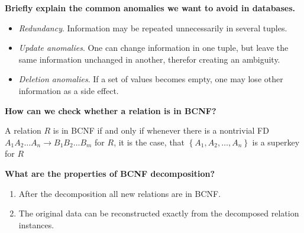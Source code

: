 \documentclass[a4paper]{article}
\newcommand{\set}[1]{\left\{#1\right\}}
\newcommand{\ra}{\rightarrow}
\newenvironment{problem}[1][\unskip]%
{\centering\textbf{ #1}%

\vspace{0.5cm}
\begin{em}}%
{\end{em}}
\newenvironment{answer}%
{\begin{framed}%
\vspace{0.5cm}}%
{\end{framed}\vspace{0.5cm}}
\begin{document}
	\newpage
	\begin{problem}[Briefly explain the common anomalies we want to avoid in databases.]
	\end{problem}
	\begin{answer}
		\begin{itemize}
			\item \emph{Redundancy}. Information may be repeated unnecessarily in several tuples.
			\item \emph{Update anomalies}. One can change information in one tuple, but leave the same information unchanged in another, therefor creating an ambiguity.
			\item \emph{Deletion anomalies}. If a set of values becomes empty, one may lose other information as a side effect.
		\end{itemize}
	\end{answer}

	\begin{problem}[How can we check whether a relation is in BCNF?]
	\end{problem}
	\begin{answer}
		A relation $R$ is in BCNF if and only if whenever there is a nontrivial FD $A_1 A_2 \dots A_n \ra B_1 B_2 \dots B_m$ for $R$, it is the case, that $\set{A_1, A_2, \dots, A_n}$ is a superkey for $R$
	\end{answer}

	\begin{problem}[What are the properties of BCNF decomposition?]
	\end{problem}
	\begin{answer}
		\begin{enumerate}
			\item After the decomposition all new relations are in BCNF.
			\item The original data can be reconstructed exactly from the decomposed relation instances.
		\end{enumerate}
	\end{answer}
\end{document}
